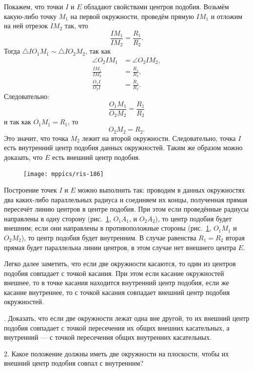 \documentclass[twoside]{book}
\begin{document}
Покажем, что точки $I$ и $E$ обладают свойствами центров подобия.
Возьмём какую-либо точку $M_1$ на первой окружности, проведём прямую $IM_1$ и отложим на ней отрезок $IM_2$ так, что 
\[\frac{IM_1}{IM_2}=\frac{R_1}{R_2}.\] 
Тогда $\triangle IO_1M_1\sim\triangle IO_2M_2$, так как 
\begin{align*}
\angle O_2IM_1&=\angle O_2IM_2,
\\
\frac{IM_1}{IM_2}&=\frac{R_1}{R_2},
\\
\frac{O_1I}{O_2I}&=\frac{R_1}{R_2}.
\end{align*}
Следовательно:
\[\frac{O_1M_1}{O_2M_2}=\frac{R_1}{R_2}\]
и так как $O_1M_1=R_1$, то
\[O_2M_2=R_2.\]
Это значит, что точка $M_2$ лежит на второй окружности.
Следовательно, точка $I$ есть внутренний центр подобия данных окружностей.
Таким же образом можно доказать, что $E$ есть внешний центр подобия.

\begin{figure}[h]
\centering
\texttt{[image: mppics/ris-186]}
\caption{}\label{1938/ris-186}
\end{figure}

Построение точек $I$ и $E$ можно выполнить так:
проводим в данных окружностях два каких-либо параллельных радиуса и соединяем их концы, полученная прямая пересечёт линию центров в центре подобия.
При этом если проведённые радиусы направлены в одну сторону (рис.~\ref{1938/ris-186}, $O_1A_1$, и $O_2A_2$), то центр подобия будет внешним;
если они направлены в противоположные стороны (рис.~\ref{1938/ris-186}, $O_1M_1$ и $O_2M_2$), то центр подобия будет внутренним.
В случае равенства $R_1=R_2$ вторая прямая будет параллельна линии центров, в этом случае нет внешнего центра $E$.

\smallskip

Легко далее заметить, что если две окружности касаются, то один из центров подобия совпадает с точкой касания.
При этом если касание окружностей внешнее, то в точке касания находится внутренний центр подобия, если же касание внутреннее, то с точкой касания совпадает внешний центр подобия окружностей.

\smallskip
{}.
Доказать, что если две окружности лежат одна вне другой, то их внешний центр подобия совпадает с точкой пересечения их общих внешних касательных, а внутренний — с точкой пересечения общих внутренних касательных.

2.
Какое положение должны иметь две окружности на плоскости, чтобы их внешний центр подобия совпал с внутренним? 
\end{document}
